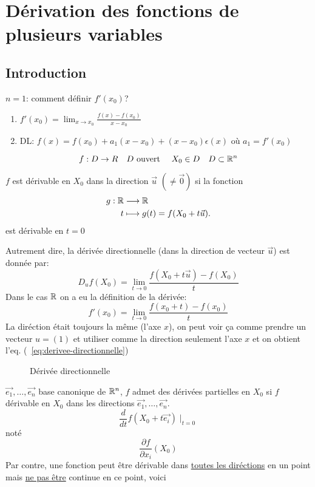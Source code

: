 
\chapter{Dérivation des fonctions de plusieurs variables}
\section{Introduction}
$n = 1$: comment définir  $f'(x_0)$?
\begin{enumerate}
    \item $f'(x_0) = \lim_{x \to x_0} \frac{f(x) - f(x_0)}{x - x_0}$
    \item DL: $f(x) = f(x_0) + a_1(x - x_0) + (x - x_0)\epsilon(x)$ où $a_1 = f'(x_0)$
\end{enumerate}

\[
f: D \to R \quad D \text{ ouvert } \quad X_0 \in D \quad D \subset \mathbb{R}^n
\] 

\begin{definition}
    $f$ est dérivable en  $X_0$ dans la direction $\vec{u}$ $(\neq \vec{0})$ si la fonction
    \begin{align*}
        g: \mathbb{R} &\longrightarrow \mathbb{R} \\
        t &\longmapsto g(t) = f(X_0 + t\vec{u})
    .\end{align*}
    est dérivable en $t = 0$
\end{definition}
Autrement dire, la dérivée directionnelle (dans la direction de vecteur $\vec{u}$) est donnée par:
\begin{equation}\label{eq:derivee-directionnelle}
    D_{u}f(X_0) = \lim_{t \to 0} \frac{f(X_0 + t\vec{u}) - f(X_0)}{t}
\end{equation}
Dans le cas $\mathbb{R}$ on a eu la définition de la dérivée:
\[
f'(x_0) = \lim_{t \to 0} \frac{f(x_0 + t) - f(x_0)}{t} 
\] 
La diréction était toujours la même (l'axe $x$), on peut voir ça comme prendre un vecteur $u = (1)$ et utiliser comme la direction seulement l'axe $x$ et on obtient  l'eq. (~\ref{eq:derivee-directionnelle})
\begin{figure}[H]
    \centering
    \caption{Dérivée directionnelle}
    \label{fig:continuite-multidimensionelle}
\end{figure}
$\vec{e_1}, \ldots, \vec{e_n}$ base canonique de $\mathbb{R}^n$, $f$ admet des dérivées partielles en  $X_0$ si $f$ dérivable en  $X_0$ dans les directions $\vec{e_1}, \ldots, \vec{e_n}$.
\[
    \frac{d}{dt} f(X_0 + t \vec{e_i}) \mid_{t = 0}
\] 
noté
\[
\frac{\partial f}{\partial x_i}(X_0)
\] 
Par contre, une fonction peut être dérivable dans \underline{toutes les diréctions} en un point mais \underline{ne pas être} continue en ce point, voici 

